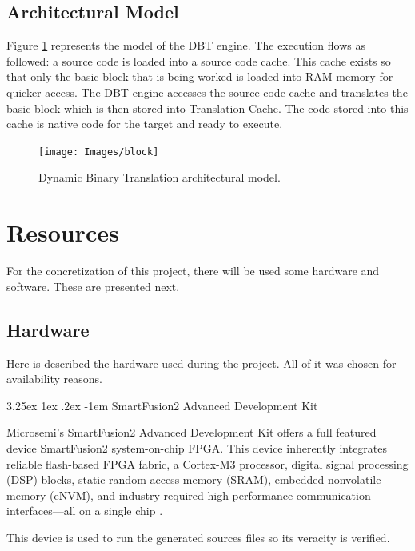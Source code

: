 \documentclass[11pt]{report}
\makeatletter
\renewcommand\paragraph{\@startsection{paragraph}{5}{\z@}%
	{3.25ex \@plus1ex \@minus.2ex}%
	{-1em}%
	{\normalfont\normalsize\bfseries}}
\makeatother
\begin{document}
			
	\subsection{Architectural Model}
	\par Figure \ref{fig:block} represents the model of the DBT engine. The execution flows as followed: a source code is loaded into a source code cache. This cache exists so that only the basic block that is being worked is loaded into RAM memory for quicker access. The DBT engine accesses the source code cache and translates the basic block which is then stored into Translation Cache. The code stored into this cache is native code for the target and ready to execute\cite{f.salgadoj.mendesa.tavaresm.ekpanyapong}.
		
	\begin{figure} [H]
		\centering
		\texttt{[image: Images/block]}
		\caption{Dynamic Binary Translation architectural model.}
		\label{fig:block}
	\end{figure}


	\section{Resources}
	
		\par For the concretization of this project, there will be used some hardware and software. These are presented next.

		\subsection{Hardware}
		
			\par Here is described the hardware used during the project. All of it was chosen for availability reasons. 

			\paragraph{SmartFusion2 Advanced Development Kit}
			
			\par Microsemi's SmartFusion2 Advanced Development Kit offers a full featured device SmartFusion2 system-on-chip FPGA. This device inherently integrates reliable flash-based FPGA fabric, a Cortex-M3 processor, digital signal processing (DSP) blocks, static random-access memory (SRAM), embedded nonvolatile memory (eNVM), and industry-required high-performance communication interfaces—all on a single chip \cite{microsemi}. 
			\par This device is used to run the generated sources files so its veracity is verified. 
			
\end{document}
